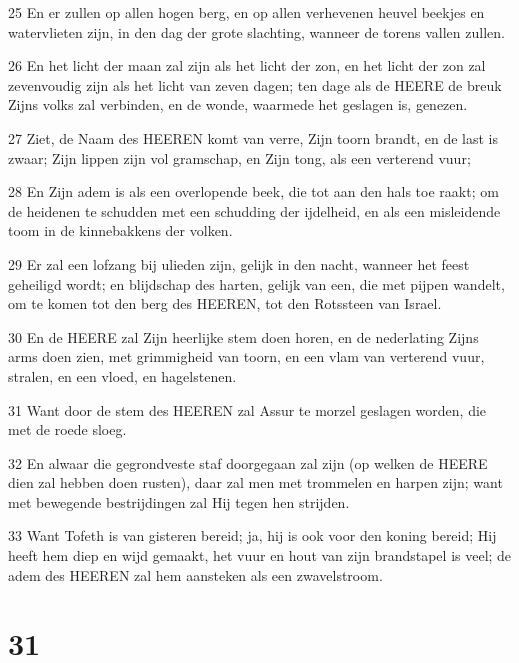 \par 25 En er zullen op allen hogen berg, en op allen verhevenen heuvel beekjes en watervlieten zijn, in den dag der grote slachting, wanneer de torens vallen zullen.
\par 26 En het licht der maan zal zijn als het licht der zon, en het licht der zon zal zevenvoudig zijn als het licht van zeven dagen; ten dage als de HEERE de breuk Zijns volks zal verbinden, en de wonde, waarmede het geslagen is, genezen.
\par 27 Ziet, de Naam des HEEREN komt van verre, Zijn toorn brandt, en de last is zwaar; Zijn lippen zijn vol gramschap, en Zijn tong, als een verterend vuur;
\par 28 En Zijn adem is als een overlopende beek, die tot aan den hals toe raakt; om de heidenen te schudden met een schudding der ijdelheid, en als een misleidende toom in de kinnebakkens der volken.
\par 29 Er zal een lofzang bij ulieden zijn, gelijk in den nacht, wanneer het feest geheiligd wordt; en blijdschap des harten, gelijk van een, die met pijpen wandelt, om te komen tot den berg des HEEREN, tot den Rotssteen van Israel.
\par 30 En de HEERE zal Zijn heerlijke stem doen horen, en de nederlating Zijns arms doen zien, met grimmigheid van toorn, en een vlam van verterend vuur, stralen, en een vloed, en hagelstenen.
\par 31 Want door de stem des HEEREN zal Assur te morzel geslagen worden, die met de roede sloeg.
\par 32 En alwaar die gegrondveste staf doorgegaan zal zijn (op welken de HEERE dien zal hebben doen rusten), daar zal men met trommelen en harpen zijn; want met bewegende bestrijdingen zal Hij tegen hen strijden.
\par 33 Want Tofeth is van gisteren bereid; ja, hij is ook voor den koning bereid; Hij heeft hem diep en wijd gemaakt, het vuur en hout van zijn brandstapel is veel; de adem des HEEREN zal hem aansteken als een zwavelstroom.

\chapter{31}

